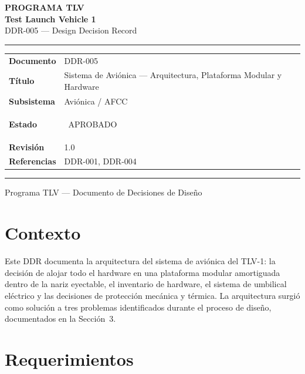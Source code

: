 \documentclass[11pt, a4paper]{article}
\newcommand{\status}[1]{\colorbox{tlvgreen}{\color{white}\small\bfseries\strut\ #1\ }}
\begin{document}
\begin{titlepage}
  \centering\vspace*{3cm}
  {\large\color{gray}\bfseries PROGRAMA TLV}\\[0.4cm]
  {\Huge\color{tlvblue}\bfseries Test Launch Vehicle 1}\\[0.3cm]
  {\Large\color{tlvmid} DDR-005 --- Design Decision Record}\\[2cm]
  \color{tlvrule}\hrule height 0.8pt\vspace{0.6cm}
  \begin{tabular}{L{4cm} L{9cm}}
    \textbf{Documento}    & DDR-005 \\
    \textbf{T\'{i}tulo}   & Sistema de Avi\'{o}nica --- Arquitectura, Plataforma Modular y Hardware \\
    \textbf{Subsistema}   & Avi\'{o}nica / AFCC \\
    \textbf{Estado}       & \status{APROBADO} \\
    \textbf{Revisi\'{o}n} & 1.0 \\
    \textbf{Referencias}  & DDR-001, DDR-004 \\
  \end{tabular}
  \vspace{0.6cm}\color{tlvrule}\hrule height 0.8pt\vfill
  {\small\color{gray} Programa TLV --- Documento de Decisiones de Dise\~{n}o}
\end{titlepage}

\section{Contexto}

Este DDR documenta la arquitectura del sistema de avi\'{o}nica del TLV-1: la decisi\'{o}n de alojar todo el hardware en una plataforma modular amortiguada dentro de la nariz eyectable, el inventario de hardware, el sistema de umbilical el\'{e}ctrico y las decisiones de protecci\'{o}n mec\'{a}nica y t\'{e}rmica. La arquitectura surgi\'{o} como soluci\'{o}n a tres problemas identificados durante el proceso de dise\~{n}o, documentados en la Secci\'{o}n~3.

\section{Requerimientos}
\end{document}
